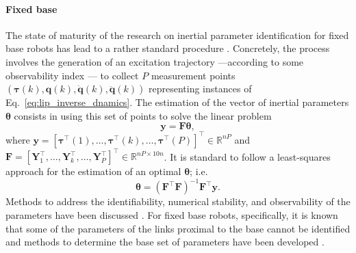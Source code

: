 \paragraph*{Fixed base} The state of maturity of the research on inertial parameter identification for fixed base robots has lead to a rather standard procedure \cite{Swevers2007Dynamicmodelidentification}. Concretely, the process involves the generation of an excitation trajectory \cite{Gautier1992ExcitingTrajectoriesRobot,Park2006Fourierbasedoptimal} ---according to some observability index --- to collect $P$ measurement points $\left(\bm{\tau}{(k)},\bm{q}{(k)},\dot{\bm{q}}{(k)},\ddot{\bm{q}}{(k)}\right)$ representing instances of Eq.~\eqref{eq:lip_inverse_dnamics}. The estimation of the vector of inertial parameters $\bm{\theta}$ consists in using this set of points to solve the linear problem
\begin{equation}
	\bm{y} = \bm{F}\bm{\theta},
\end{equation}
where $\bm{y} = [\bm{\tau}^\intercal{(1)},\ldots,\bm{\tau}^\intercal(k),\ldots,\bm{\tau}^\intercal(P)]^\intercal \in \mathbb{R}^{nP}$ and $\bm{F} = [\bm{Y}_1^\intercal,\ldots,\bm{Y}_k^\intercal,\ldots,\bm{Y}_P^\intercal]^\intercal \in \mathbb{R}^{nP \times 10n}$. 
It is standard to follow a least-squares approach for the estimation of an optimal $\bm{\theta}$; i.e.
\begin{equation}
	\bm{\theta} = \left(\bm{F}^\intercal\bm{F}\right)^{-1}\bm{F}^\intercal\bm{y}.
\end{equation}
Methods to address the identifiability, numerical stability, and observability of the parameters have been discussed \cite{Siciliano2007SpringerHandbookRobotics}. For fixed base robots, specifically, it is known that some of the parameters of the links proximal to the base cannot be identified and methods to determine the base set of parameters have been developed \cite{Khalil2004Modelingidentificationcontrol}.


